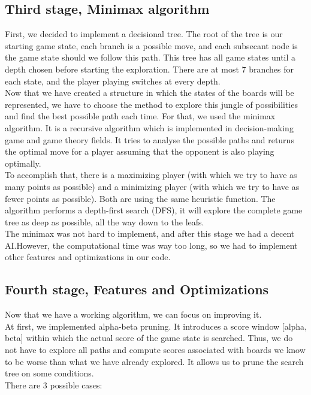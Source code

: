 \documentclass[11pt, a4paper, oneside]{report}
\begin{document}
	\subsection{Third stage, Minimax algorithm}

	First, we decided to implement a decisional tree. The root of the tree is our starting game state, each branch is a possible move, and each subsecant node is the game state should we follow this path. This tree has all game states until a depth chosen before starting the exploration. There are at most 7 branches for each state, and the player playing switches at every depth. \\

	Now that we have created a structure in which the states of the boards will be represented, we have to choose the method to explore this jungle of possibilities and find the best possible path each time. For that, we used the minimax algorithm. It is a recursive algorithm which is implemented in decision-making game and game theory fields. It tries to analyse the possible paths and returns the optimal move for a player assuming that the opponent is also playing optimally. \\

	To accomplish that, there is a maximizing player (with which we try to have as many points as possible) and a minimizing player (with which we try to have as fewer points as possible). Both are using the same heuristic function. The algorithm performs a depth-first search (DFS), it will explore the complete game tree as deep as possible, all the way down to the leafs. \\
	The minimax was not hard to implement, and after this stage we had a decent AI.\@ However, the computational time was way too long, so we had to implement other features and optimizations in our code. \\

	\subsection{Fourth stage, Features and Optimizations}
	Now that we have a working algorithm, we can focus on improving it. \\

	At first, we implemented alpha-beta pruning. It introduces a score window [alpha, beta] within which the actual score of the game state is searched. Thus, we do not have to explore all paths and compute scores associated with boards we know to be worse than what we have already explored. It allows us to prune the search tree on some conditions. \\
	There are 3 possible cases:
\end{document}
